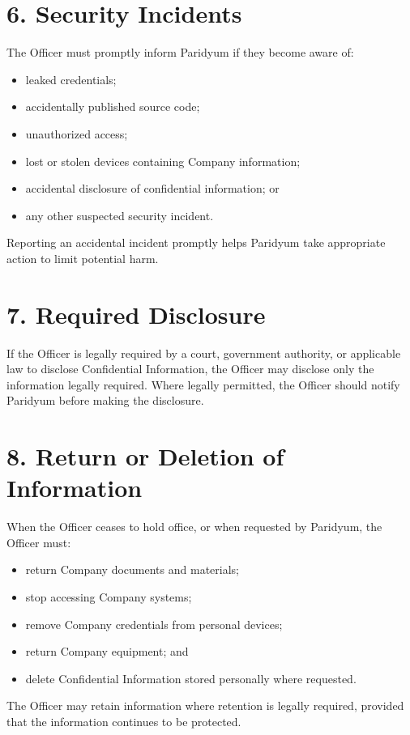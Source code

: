 \documentclass{paridyum}
\begin{document}
\section*{6. Security Incidents}
The Officer must promptly inform Paridyum if they become aware of:
\begin{itemize}[leftmargin=*, noitemsep]
    \item leaked credentials;
    \item accidentally published source code;
    \item unauthorized access;
    \item lost or stolen devices containing Company information;
    \item accidental disclosure of confidential information; or
    \item any other suspected security incident.
\end{itemize}
Reporting an accidental incident promptly helps Paridyum take appropriate action
to limit potential harm.

\section*{7. Required Disclosure}
If the Officer is legally required by a court, government authority, or applicable
law to disclose Confidential Information, the Officer may disclose only the
information legally required. Where legally permitted, the Officer should notify
Paridyum before making the disclosure.

\section*{8. Return or Deletion of Information}
When the Officer ceases to hold office, or when requested by Paridyum, the Officer
must:
\begin{itemize}[leftmargin=*, noitemsep]
    \item return Company documents and materials;
    \item stop accessing Company systems;
    \item remove Company credentials from personal devices;
    \item return Company equipment; and
    \item delete Confidential Information stored personally where requested.
\end{itemize}
The Officer may retain information where retention is legally required, provided
that the information continues to be protected.
\end{document}
